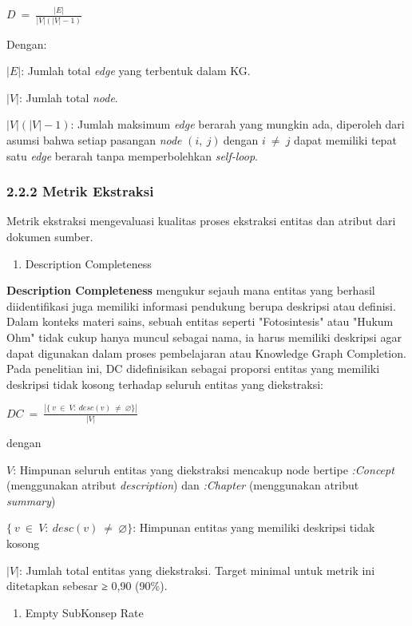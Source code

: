 \documentclass[
]{article}
\begin{document}
\(D\  = \ \frac{|E|}{|V|(|V| - 1)}\)

Dengan:

\(|E|\): Jumlah total \emph{edge} yang terbentuk dalam KG.

\(|V|\): Jumlah total \emph{node}.

\(|V|(|V| - 1)\): Jumlah maksimum \emph{edge} berarah yang mungkin ada,
diperoleh dari asumsi bahwa setiap pasangan \emph{node}
\((i,\ j)\ \)dengan \(i\  \neq \ j\) dapat memiliki tepat satu
\emph{edge} berarah tanpa memperbolehkan \emph{self-loop}.

\hypertarget{metrik-ekstraksi}{%
\subsubsection{2.2.2 Metrik Ekstraksi}\label{metrik-ekstraksi}}

Metrik ekstraksi mengevaluasi kualitas proses ekstraksi entitas dan
atribut dari dokumen sumber.

\begin{enumerate}
\def\labelenumi{\alph{enumi}.}
\item
  Description Completeness
\end{enumerate}

\textbf{Description Completeness} mengukur sejauh mana entitas yang
berhasil diidentifikasi juga memiliki informasi pendukung berupa
deskripsi atau definisi. Dalam konteks materi sains, sebuah entitas
seperti "Fotosintesis" atau "Hukum Ohm" tidak cukup hanya muncul sebagai
nama, ia harus memiliki deskripsi agar dapat digunakan dalam proses
pembelajaran atau Knowledge Graph Completion. Pada penelitian ini, DC
didefinisikan sebagai proporsi entitas yang memiliki deskripsi tidak
kosong terhadap seluruh entitas yang diekstraksi:

\(DC\  = \ \frac{|\{\ v\  \in \ V:\ desc(v)\  \neq \ \varnothing\}|}{|V|}\)

dengan

\(V\): Himpunan seluruh entitas yang diekstraksi mencakup node bertipe
\emph{:Concept} (menggunakan atribut \emph{description}) dan
\emph{:Chapter} (menggunakan atribut \emph{summary})

\(\{\ v\  \in \ V:\ desc(v)\  \neq \ \varnothing\}\): Himpunan entitas
yang memiliki deskripsi tidak kosong

\(|V|\): Jumlah total entitas yang diekstraksi. Target minimal untuk
metrik ini ditetapkan sebesar ≥ 0,90 (90\%).

\begin{enumerate}
\def\labelenumi{\alph{enumi}.}
\setcounter{enumi}{1}
\item
  Empty SubKonsep Rate
\end{enumerate}
\end{document}
